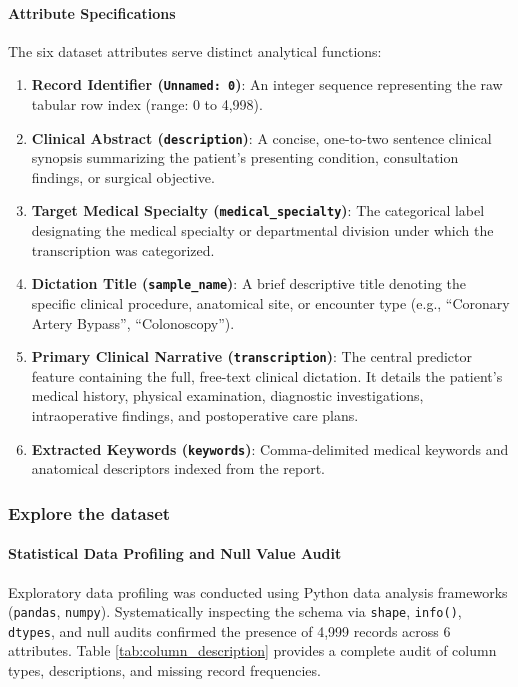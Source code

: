 \paragraph{Attribute Specifications}
The six dataset attributes serve distinct analytical functions:
\begin{enumerate}
    \item \textbf{Record Identifier (\texttt{Unnamed: 0})}: An integer sequence representing the raw tabular row index (range: 0 to 4,998).
    \item \textbf{Clinical Abstract (\texttt{description})}: A concise, one-to-two sentence clinical synopsis summarizing the patient's presenting condition, consultation findings, or surgical objective.
    \item \textbf{Target Medical Specialty (\texttt{medical\_specialty})}: The categorical label designating the medical specialty or departmental division under which the transcription was categorized.
    \item \textbf{Dictation Title (\texttt{sample\_name})}: A brief descriptive title denoting the specific clinical procedure, anatomical site, or encounter type (e.g., ``Coronary Artery Bypass'', ``Colonoscopy'').
    \item \textbf{Primary Clinical Narrative (\texttt{transcription})}: The central predictor feature containing the full, free-text clinical dictation. It details the patient's medical history, physical examination, diagnostic investigations, intraoperative findings, and postoperative care plans.
    \item \textbf{Extracted Keywords (\texttt{keywords})}: Comma-delimited medical keywords and anatomical descriptors indexed from the report.
\end{enumerate}

\subsubsection{Explore the dataset}

\paragraph{Statistical Data Profiling and Null Value Audit}
Exploratory data profiling was conducted using Python data analysis frameworks (\texttt{pandas}, \texttt{numpy}). Systematically inspecting the schema via \texttt{shape}, \texttt{info()}, \texttt{dtypes}, and null audits confirmed the presence of 4,999 records across 6 attributes. Table \ref{tab:column_description} provides a complete audit of column types, descriptions, and missing record frequencies.

